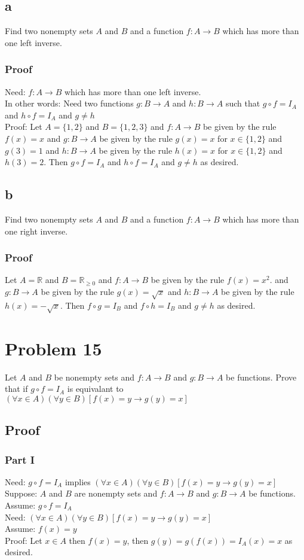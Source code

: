 \documentclass{article}
\begin{document}
\subsection*{a}
Find two nonempty sets $A$ and $B$ and a function $f: A \rightarrow B$ which has more than one left inverse.
\subsubsection*{Proof}
Need: $f: A \rightarrow B$ which has more than one left inverse.\\
In other words: Need two functions $g: B \rightarrow A$ and $h: B \rightarrow A$ such that $g \circ f = I_A$ and $h \circ f = I_A$ and $g \neq h$\\
Proof: Let $A = \{1,2\}$ and $B = \{1,2,3\}$ and $f: A \rightarrow B$ be given by the rule $f(x) = x$ and $g: B \rightarrow A$ be given by the rule $g(x) = x$ for $x \in \{1,2\}$ and $g(3)=1$ and $h: B \rightarrow A$ be given by the rule $h(x) = x$ for $x \in \{1,2\}$ and $h(3)=2$. Then $g \circ f = I_A$ and $h \circ f = I_A$ and $g \neq h$ as desired.

\subsection*{b}
Find two nonempty sets $A$ and $B$ and a function $f: A \rightarrow B$ which has more than one right inverse.
\subsubsection*{Proof}
Let $A = \mathbb{R}$ and $B = \mathbb{R}_{\geq 0}$ and $f: A \rightarrow B$ be given by the rule $f(x) = x^2$. and $g: B \rightarrow A$ be given by the rule $g(x) = \sqrt{x}$ and $h: B \rightarrow A$ be given by the rule $h(x) = -\sqrt{x}$. Then $f \circ g = I_B$ and $f \circ h = I_B$ and $g \neq h$ as desired.

\section*{Problem 15}
Let $A$ and $B$ be nonempty sets and $f: A \rightarrow B$ and $g: B \rightarrow A$ be functions. Prove that if $g \circ f = I_A$ is equivalant to $(\forall x \in A)(\forall y \in B)[f(x) = y \rightarrow g(y) = x]$
\subsection*{Proof}
\subsubsection*{Part I}
Need: $g \circ f = I_A$ implies $(\forall x \in A)(\forall y \in B)[f(x) = y \rightarrow g(y) = x]$\\
Suppose: $A$ and $B$ are nonempty sets and $f: A \rightarrow B$ and $g: B \rightarrow A$ be functions. \\
Assume: $g \circ f = I_A$\\
Need: $(\forall x \in A)(\forall y \in B)[f(x) = y \rightarrow g(y) = x]$\\
Assume: $f(x) = y$ \\ 
Proof: Let $x \in A$ then $f(x) = y$, then $g(y) = g(f(x)) = I_A(x) = x$ as desired.
\end{document}
